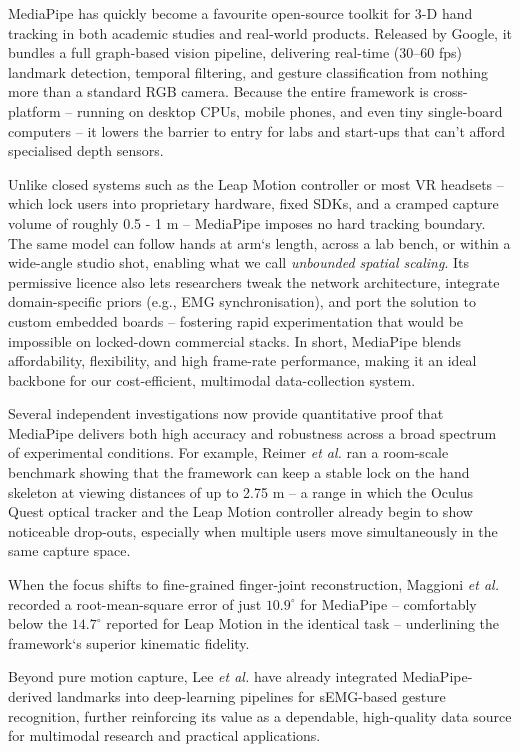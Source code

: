MediaPipe has quickly become a favourite open-source toolkit for 3-D hand tracking in both academic studies and real-world products. Released by Google, it bundles a full graph-based vision pipeline, delivering real-time (30–60 fps) landmark detection, temporal filtering, and gesture classification from nothing more than a standard RGB camera. Because the entire framework is cross-platform -- running on desktop CPUs, mobile phones, and even tiny single-board computers -- it lowers the barrier to entry for labs and start-ups that can’t afford specialised depth sensors.

Unlike closed systems such as the Leap Motion controller or most VR headsets -- which lock users into proprietary hardware, fixed SDKs, and a cramped capture volume of roughly 0.5 - 1 m -- MediaPipe imposes no hard tracking boundary. The same model can follow hands at arm`s length, across a lab bench, or within a wide-angle studio shot, enabling what we call \textit{unbounded spatial scaling}. Its permissive licence also lets researchers tweak the network architecture, integrate domain-specific priors (e.g., EMG synchronisation), and port the solution to custom embedded boards -- fostering rapid experimentation that would be impossible on locked-down commercial stacks. In short, MediaPipe blends affordability, flexibility, and high frame-rate performance, making it an ideal backbone for our cost-efficient, multimodal data-collection system.

Several independent investigations now provide quantitative proof that MediaPipe delivers both high accuracy and robustness across a broad spectrum of experimental conditions. For example, Reimer \textit{et al.} \cite{reimer2023evaluation} ran a room-scale benchmark showing that the framework can keep a stable lock on the hand skeleton at viewing distances of up to 2.75 m -- a range in which the Oculus Quest optical tracker and the Leap Motion controller already begin to show noticeable drop-outs, especially when multiple users move simultaneously in the same capture space.  

When the focus shifts to fine-grained finger-joint reconstruction, Maggioni \textit{et al.} \cite{maggioni2025optimisation} recorded a root-mean-square error of just \(10.9^{\circ}\) for MediaPipe -- comfortably below the \(14.7^{\circ}\) reported for Leap Motion in the identical task -- underlining the framework`s superior kinematic fidelity.  

Beyond pure motion capture, Lee \textit{et al.} \cite{lee2022explainable} have already integrated MediaPipe-derived landmarks into deep-learning pipelines for sEMG-based gesture recognition, further reinforcing its value as a dependable, high-quality data source for multimodal research and practical applications.

